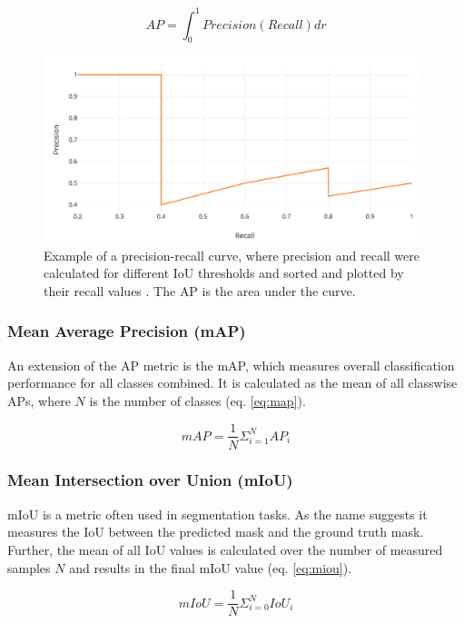 \begin{equation}
    AP = \int_0^1 Precision(Recall) dr
    \label{eq:ap}
\end{equation}

\begin{figure}
\begin{center}
    \includegraphics[width=11cm]{imgs/pr_curve.png}
    \caption{Example of a precision-recall curve, where precision and recall were calculated for different \ac{IoU} thresholds and sorted and plotted by their recall values \cite{map_article}. The \ac{AP} is the area under the curve.}
    \label{fig:pr_curve}
\end{center}
\end{figure}

\subsubsection{Mean Average Precision (mAP)}

An extension of the \ac{AP} metric is the \ac{mAP}, which measures overall classification performance for all classes combined.
It is calculated as the mean of all classwise \acp{AP}, where $N$ is the number of classes (eq. \ref{eq:map}).

\begin{equation}
    mAP = \frac{1}{N} \Sigma_{i=1}^N AP_i
    \label{eq:map}
\end{equation}

\subsubsection{Mean Intersection over Union (mIoU)}

\ac{mIoU} is a metric often used in segmentation tasks.
As the name suggests it measures the \ac{IoU} between the predicted mask and the ground truth mask.
Further, the mean of all \ac{IoU} values is calculated over the number of measured samples $N$ and results in the final \ac{mIoU} value (eq. \ref{eq:miou}).

\begin{equation}
    mIoU = \frac{1}{N} \Sigma_{i=0}^{N} IoU_i
    \label{eq:miou}
\end{equation}
